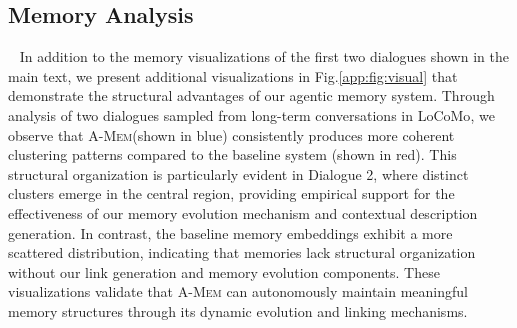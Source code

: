 \documentclass{article}
\newcommand{\ours}{\textsc{A-Mem}\xspace}
\begin{document}
\subsection{Memory Analysis}~\label{app:sec:vis}
In addition to the memory visualizations of the first two dialogues shown in the main text, we present additional visualizations in Fig.\ref{app:fig:visual} that demonstrate the structural advantages of our agentic memory system. Through analysis of two dialogues sampled from long-term conversations in LoCoMo\cite{locomo}, we observe that \ours (shown in blue) consistently produces more coherent clustering patterns compared to the baseline system (shown in red). This structural organization is particularly evident in Dialogue 2, where distinct clusters emerge in the central region, providing empirical support for the effectiveness of our memory evolution mechanism and contextual description generation. In contrast, the baseline memory embeddings exhibit a more scattered distribution, indicating that memories lack structural organization without our link generation and memory evolution components. These visualizations validate that \ours can autonomously maintain meaningful memory structures through its dynamic evolution and linking mechanisms.
\end{document}
